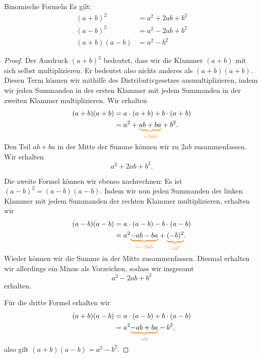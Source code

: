 \documentclass[../../main.tex]{subfiles}
\begin{document}
	\begin{theorem}{Binomische Formeln}
		Es gilt:
		\begin{align}
			(a+b)^2&=a^2+2ab+b^2\\
			(a-b)^2&=a^2-2ab+b^2\\
			(a+b)(a-b)&=a^2-b^2
		\end{align}
	\end{theorem}
	\begin{proof}
		Der Ausdruck $(a+b)^2$ bedeutet, dass wir die Klammer $(a+b)$ mit sich selbst multiplizieren. Er bedeutet also nichts anderes als $(a+b)(a+b)$. Diesen Term können wir mithilfe des Distributivgesetzes ausmultiplizieren, indem wir jeden Summanden in der ersten Klammer mit jedem Summanden in der zweiten Klammer multiplizieren. Wir erhalten
		\begin{align*}
			(a+b)(a+b)&=a\cdot (a+b)+b\cdot (a+b)\\
			&=a^2+\colorbrace{ab+ba}{=2ab}+b^2.
		\end{align*}
		Den Teil $ab+ba$ in der Mitte der Summe können wir zu $2ab$ zusammenfassen. Wir erhalten \[a^2+2ab+b^2.\]

		Die zweite Formel können wir ebenso nachrechnen: Es ist $(a-b)^2=(a-b)(a-b)$. Indem wir nun jeden Summanden der linken Klammer mit jedem Summanden der rechten Klammer multiplizieren, erhalten wir
		\begin{align*}
			(a-b)(a-b)&=a\cdot (a-b)-b\cdot (a-b)\\&=a^2\colorbrace{-ab-ba}{=-2ab}+\colorbrace{(-b)^2}{=b^2}.
		\end{align*}
		Wieder können wir die Summe in der Mitte zusammenfassen. Diesmal erhalten wir allerdings ein Minus als Vorzeichen, sodass wir insgesamt \[a^2-2ab+b^2\] erhalten.

		Für die dritte Formel erhalten wir 
		\begin{align*}
			(a+b)(a-b)&=a\cdot (a-b)+b\cdot (a-b)\\
			&=a^2\colorbrace{-ab+ba}{=0}-b^2,
		\end{align*}
		also gilt $(a+b)(a-b)=a^2-b^2$.
	\end{proof}
\end{document}
